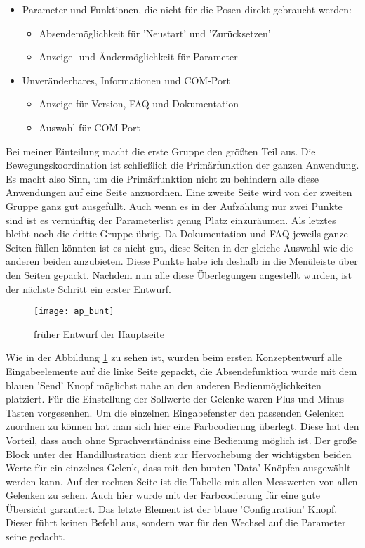 \documentclass[11pt]{scrartcl}
\begin{document}
\begin{onehalfspace}
\begin{itemize}
\item Parameter und Funktionen, die nicht für die Posen direkt gebraucht werden:
\begin{itemize}
\item Absendemöglichkeit für 'Neustart' und 'Zurücksetzen'
\item Anzeige- und Ändermöglichkeit für Parameter
\end{itemize}

\item Unveränderbares, Informationen und COM-Port
\begin{itemize}
 \item Anzeige für Version, FAQ und Dokumentation
 \item Auswahl für COM-Port
\end{itemize}
\end{itemize}

Bei meiner Einteilung macht die erste Gruppe den größten Teil aus. Die Bewegungskoordination ist schließlich die Primärfunktion der ganzen Anwendung. Es macht also Sinn, um die Primärfunktion nicht zu behindern alle diese Anwendungen auf eine Seite anzuordnen. Eine zweite Seite wird von der zweiten Gruppe ganz gut ausgefüllt. Auch wenn es in der Aufzählung nur zwei Punkte sind ist es vernünftig der Parameterlist genug Platz einzuräumen.
Als letztes bleibt noch die dritte Gruppe übrig. Da Dokumentation und FAQ jeweils ganze Seiten füllen könnten ist es nicht gut, diese Seiten in der gleiche Auswahl wie die anderen beiden anzubieten. Diese Punkte habe ich deshalb in die Menüleiste über den Seiten gepackt. Nachdem nun alle diese Überlegungen angestellt wurden, ist der nächste Schritt ein erster Entwurf.

\begin{figure}[H]
\texttt{[image: ap\_bunt]}
\caption{früher Entwurf der Hauptseite}
\label{fig:ap_bunt}
\end{figure}
\vspace{1cm}

Wie in der Abbildung \ref{fig:ap_bunt} zu sehen ist, wurden beim ersten Konzeptentwurf alle Eingabeelemente auf die linke Seite gepackt, die Absendefunktion wurde mit dem blauen 'Send' Knopf möglichst nahe an den anderen Bedienmöglichkeiten platziert. Für die Einstellung der Sollwerte der Gelenke waren Plus und Minus Tasten vorgesenhen. Um die einzelnen Eingabefenster den passenden Gelenken zuordnen zu können hat man sich hier eine Farbcodierung überlegt. Diese hat den Vorteil, dass auch ohne Sprachverständniss eine Bedienung möglich ist.
Der große Block unter der Handillustration dient zur Hervorhebung der wichtigsten beiden Werte für ein einzelnes Gelenk, dass mit den bunten 'Data' Knöpfen ausgewählt werden kann. Auf der rechten Seite ist die Tabelle mit allen Messwerten von allen Gelenken zu sehen. Auch hier wurde mit der Farbcodierung für eine gute Übersicht garantiert. Das letzte Element ist der blaue 'Configuration' Knopf. Dieser führt keinen Befehl aus, sondern war für den Wechsel auf die Parameter seine gedacht.


\end{onehalfspace}
\end{document}
